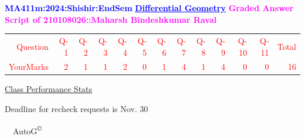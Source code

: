 \documentclass{article}                              %
\begin{document}
%
\vspace*{1in}

\begin{center}
	\textbf{\textcolor{blue}{\LARGE MA411m:2024:Shishir:EndSem}}
	\vskip 1cm
	\textbf{\textcolor{blue}{\underline{\Large Differential Geometry}}}
	\vskip 1cm
	\textbf{\textcolor{magenta}{\LARGE Graded Answer Script of 210108026::Maharsh Bindeshkumar Raval}}
\end{center}


\begin{center}
	\Huge 
	\textcolor{red}{
	\begin{tabular}{*{13}{r}}
		Question&Q-1& Q-2& Q-3& Q-4& Q-5& Q-6& Q-7& Q-8& Q-9& Q-10& Q-11&Total  \\
        	YourMarks&2&1&1&2&0&1&4&1&4&0&0&16
	\end{tabular}
	}
        \vskip 2cm
	\large
	\underline{Class Performance Stats}
	\DTLsetseparator{;}
	\begin{table}[htbp]
		\centering
	\end{table}
	\vskip 1cm
	Deadline for recheck requests is Nov. 30
\end{center}
\ \vfill \ \hfill \small AutoG\textsuperscript{\copyright}
\newpage
%
\end{document}
